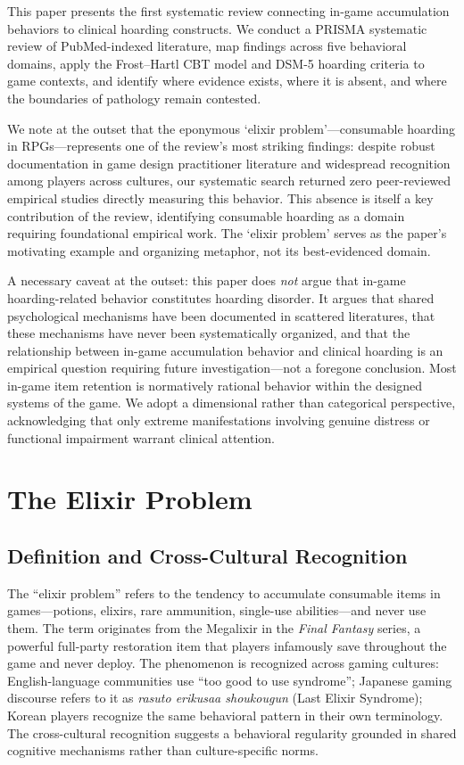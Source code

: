 \documentclass[12pt]{article}
\begin{document}
This paper presents the first systematic review connecting in-game accumulation behaviors to clinical hoarding constructs. We conduct a PRISMA systematic review of PubMed-indexed literature, map findings across five behavioral domains, apply the Frost--Hartl CBT model and DSM-5 hoarding criteria to game contexts, and identify where evidence exists, where it is absent, and where the boundaries of pathology remain contested.

We note at the outset that the eponymous `elixir problem'---consumable hoarding in RPGs---represents one of the review's most striking findings: despite robust documentation in game design practitioner literature and widespread recognition among players across cultures, our systematic search returned zero peer-reviewed empirical studies directly measuring this behavior. This absence is itself a key contribution of the review, identifying consumable hoarding as a domain requiring foundational empirical work. The `elixir problem' serves as the paper's motivating example and organizing metaphor, not its best-evidenced domain.

A necessary caveat at the outset: this paper does \textit{not} argue that in-game hoarding-related behavior constitutes hoarding disorder. It argues that shared psychological mechanisms have been documented in scattered literatures, that these mechanisms have never been systematically organized, and that the relationship between in-game accumulation behavior and clinical hoarding is an empirical question requiring future investigation---not a foregone conclusion. Most in-game item retention is normatively rational behavior within the designed systems of the game. We adopt a dimensional rather than categorical perspective, acknowledging that only extreme manifestations involving genuine distress or functional impairment warrant clinical attention.

\section{The Elixir Problem}

\subsection{Definition and Cross-Cultural Recognition}

The ``elixir problem'' refers to the tendency to accumulate consumable items in games---potions, elixirs, rare ammunition, single-use abilities---and never use them. The term originates from the Megalixir in the \textit{Final Fantasy} series, a powerful full-party restoration item that players infamously save throughout the game and never deploy. The phenomenon is recognized across gaming cultures: English-language communities use ``too good to use syndrome''; Japanese gaming discourse refers to it as \textit{rasuto erikusaa shoukougun} (Last Elixir Syndrome); Korean players recognize the same behavioral pattern in their own terminology. The cross-cultural recognition suggests a behavioral regularity grounded in shared cognitive mechanisms rather than culture-specific norms.
\end{document}

